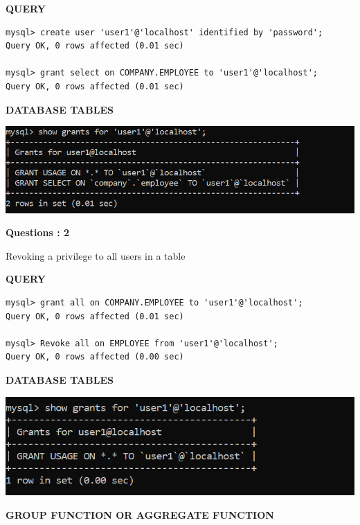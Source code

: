 \documentclass[a4paper,12pt]{report}
\begin{document}
	\begin{flushleft}
		\textbf{QUERY }
	\end{flushleft}
\begin{verbatim}
mysql> create user 'user1'@'localhost' identified by 'password';
Query OK, 0 rows affected (0.01 sec)

mysql> grant select on COMPANY.EMPLOYEE to 'user1'@'localhost';
Query OK, 0 rows affected (0.01 sec)

\end{verbatim}
\begin{flushleft}
		\textbf{DATABASE TABLES} 
\end{flushleft} 

\includegraphics[scale=1]{grant.png}

\begin{flushleft}
    \textbf{Questions : 2}
\end{flushleft}
Revoking a privilege to all users in a table
	\begin{flushleft}
		\textbf{QUERY }
	\end{flushleft}
\begin{verbatim}
mysql> grant all on COMPANY.EMPLOYEE to 'user1'@'localhost';
Query OK, 0 rows affected (0.01 sec)

mysql> Revoke all on EMPLOYEE from 'user1'@'localhost';
Query OK, 0 rows affected (0.00 sec)

\end{verbatim}
\begin{flushleft}
		\textbf{DATABASE TABLES} 
\end{flushleft} 

\includegraphics[scale=1]{grant2.png}
\newpage
\begin{center}
		\large\textbf{GROUP FUNCTION OR AGGREGATE FUNCTION}
	\end{center}
	
\end{document}
